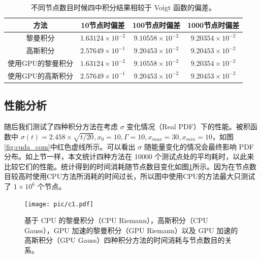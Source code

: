 \begin{table}
    \centering
    \caption{不同节点数目时候四中积分结果相较于 Voigt 函数的偏差。}
    \begin{tabular*}{\textwidth}{@{\extracolsep{\fill}}cccc}
        \hline
        \hline							
        方法	&	10节点时偏差	&	100节点时偏差	&	1000节点时偏差	\\\hline
        黎曼积分	&	$1.63124\times10^{-2}$	&	$9.10558\times10^{-2}$	&	$9.20354\times10^{-2}$	\\
        高斯积分	&	$2.57649\times10^{-1}$	&	$9.20453\times10^{-2}$	&	$9.20453\times10^{-2}$	\\
        使用GPU的黎曼积分	&	$1.63124\times10^{-2}$	&	$9.10558\times10^{-2}$	&	$9.20354\times10^{-2}$	\\
        使用GPU的高斯积分	&	$2.57649\times10^{-1}$	&	$9.20453\times10^{-2}$	&	$9.20453\times10^{-2}$	\\
        \hline
        \hline
    \end{tabular*}

    \label{tab:cuda_dif}
\end{table}

\subsection{性能分析}

随后我们测试了四种积分方法在考虑 $\sigma$ 变化情况（Real PDF）下的性能。被积函数中 $\sigma(t)=2.458\times\sqrt{t/20}, x_0=10, \Gamma=10,x_{max}=30,x_{min}=10$，如图\ref{fig:cuda_com}中红色虚线所示。可以看出 $\sigma$ 随能量变化的情况会最终影响 PDF 分布。如上节一样，本文统计四种方法在 10000 个测试点处的平均耗时，以此来比较它们的性能。统计得到的时间消耗随节点数目变化如图\ref{fig:cuda_2}所示。因为在节点数目较高时使用CPU方法所消耗的时间过长，所以图中使用CPU的方法最大只测试了 $1\times10^6$ 个节点。

\begin{figure}
    \centering
    \texttt{[image: pic/c1.pdf]}
    \caption{ 基于 CPU 的黎曼积分（CPU Riemann），高斯积分（CPU Gauss），GPU 加速的黎曼积分（GPU Riemann）以及 GPU 加速的高斯积分（GPU Gauss）四种积分方法的时间消耗与节点数目的关系。}
    \label{fig:cuda_2}
\end{figure}

